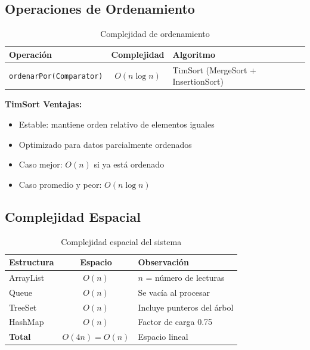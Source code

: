 \documentclass[12pt,a4paper]{article}
\begin{document}
\subsection{Operaciones de Ordenamiento}

\begin{table}[h]
\centering
\begin{tabular}{|l|c|l|}
\hline
\rowcolor{agrogreen!20}
\textbf{Operación} & \textbf{Complejidad} & \textbf{Algoritmo} \\
\hline
\texttt{ordenarPor(Comparator)} & $O(n \log n)$ & TimSort (MergeSort + InsertionSort) \\
\hline
\end{tabular}
\caption{Complejidad de ordenamiento}
\label{tab:complejidad-ordenamiento}
\end{table}

\textbf{TimSort Ventajas:}
\begin{itemize}
    \item Estable: mantiene orden relativo de elementos iguales
    \item Optimizado para datos parcialmente ordenados
    \item Caso mejor: $O(n)$ si ya está ordenado
    \item Caso promedio y peor: $O(n \log n)$
\end{itemize}

\subsection{Complejidad Espacial}

\begin{table}[h]
\centering
\begin{tabular}{|l|c|p{7cm}|}
\hline
\rowcolor{agrogreen!20}
\textbf{Estructura} & \textbf{Espacio} & \textbf{Observación} \\
\hline
ArrayList & $O(n)$ & $n$ = número de lecturas \\
Queue & $O(n)$ & Se vacía al procesar \\
TreeSet & $O(n)$ & Incluye punteros del árbol \\
HashMap & $O(n)$ & Factor de carga 0.75 \\
\hline
\textbf{Total} & $O(4n) = O(n)$ & Espacio lineal \\
\hline
\end{tabular}
\caption{Complejidad espacial del sistema}
\label{tab:complejidad-espacial}
\end{table}
\end{document}
